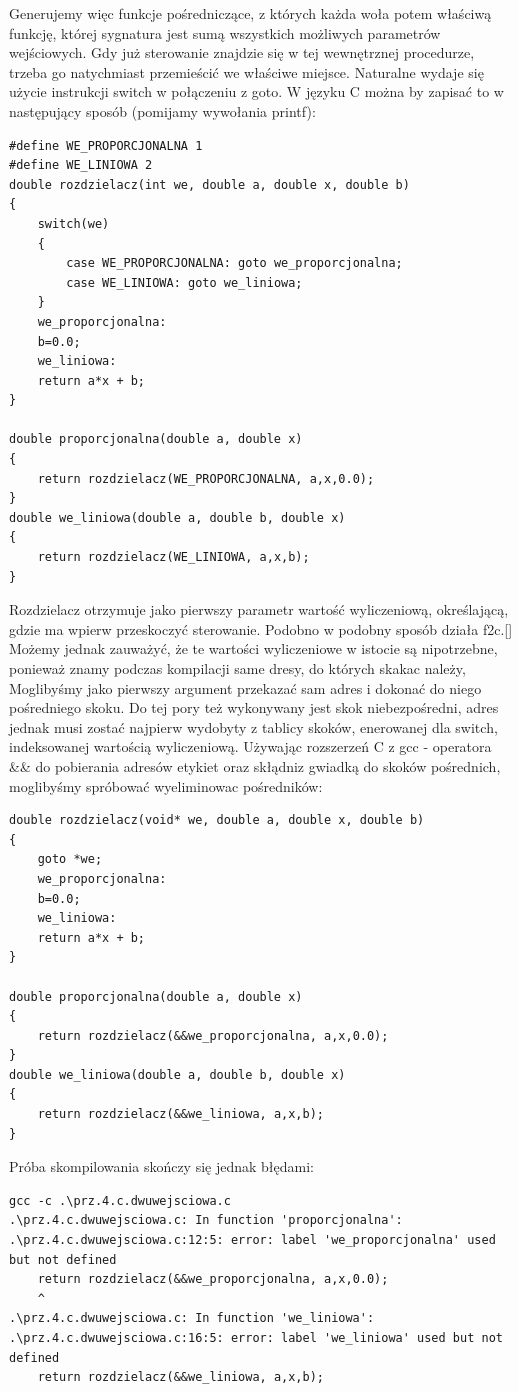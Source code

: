 Generujemy więc funkcje pośredniczące, z których każda woła potem właściwą funkcję, której sygnatura jest sumą wszystkich możliwych parametrów wejściowych. Gdy już sterowanie znajdzie się w tej wewnętrznej procedurze, trzeba go natychmiast przemieścić we właściwe miejsce. Naturalne wydaje się użycie instrukcji switch w połączeniu z goto. W języku C można by zapisać to w następujący sposób (pomijamy wywołania printf):
\begin{lstlisting}
#define WE_PROPORCJONALNA 1
#define WE_LINIOWA 2
double rozdzielacz(int we, double a, double x, double b)
{
	switch(we)
	{
    	case WE_PROPORCJONALNA: goto we_proporcjonalna;
    	case WE_LINIOWA: goto we_liniowa;
	}
	we_proporcjonalna:
	b=0.0;
	we_liniowa:
	return a*x + b;
}

double proporcjonalna(double a, double x)
{
	return rozdzielacz(WE_PROPORCJONALNA, a,x,0.0);
}
double we_liniowa(double a, double b, double x)
{
	return rozdzielacz(WE_LINIOWA, a,x,b);
}
\end{lstlisting}
Rozdzielacz otrzymuje jako pierwszy parametr wartość wyliczeniową, określającą, gdzie ma wpierw przeskoczyć sterowanie.
Podobno w podobny sposób działa f2c.[] Możemy jednak zauważyć, że te wartości wyliczeniowe w istocie są nipotrzebne, ponieważ znamy podczas kompilacji same dresy, do których skakac należy, Moglibyśmy jako pierwszy argument przekazać sam adres i dokonać do niego pośredniego skoku. Do tej pory też wykonywany jest skok niebezpośredni, adres jednak musi zostać najpierw wydobyty z tablicy skoków, enerowanej dla switch, indeksowanej wartością wyliczeniową. Używając rozszerzeń C z gcc - operatora \&\& do pobierania adresów etykiet oraz skłądniz gwiadką do skoków pośrednich, moglibyśmy spróbować wyeliminowac pośredników:
\begin{lstlisting}
double rozdzielacz(void* we, double a, double x, double b)
{
	goto *we;
	we_proporcjonalna:
	b=0.0;
	we_liniowa:
	return a*x + b;
}

double proporcjonalna(double a, double x)
{
	return rozdzielacz(&&we_proporcjonalna, a,x,0.0);
}
double we_liniowa(double a, double b, double x)
{
	return rozdzielacz(&&we_liniowa, a,x,b);
}
\end{lstlisting}
Próba skompilowania skończy się jednak błędami:
\begin{lstlisting}
gcc -c .\prz.4.c.dwuwejsciowa.c
.\prz.4.c.dwuwejsciowa.c: In function 'proporcjonalna':
.\prz.4.c.dwuwejsciowa.c:12:5: error: label 'we_proporcjonalna' used but not defined
 	return rozdzielacz(&&we_proporcjonalna, a,x,0.0);
 	^
.\prz.4.c.dwuwejsciowa.c: In function 'we_liniowa':
.\prz.4.c.dwuwejsciowa.c:16:5: error: label 'we_liniowa' used but not defined
 	return rozdzielacz(&&we_liniowa, a,x,b);
\end{lstlisting}
